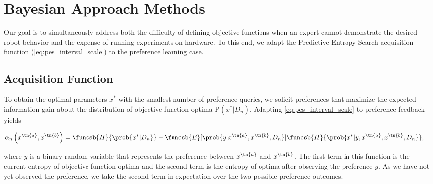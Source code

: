 \section{Bayesian Approach Methods}
Our goal is to simultaneously address both the difficulty of defining objective
functions when an expert cannot demonstrate the desired robot behavior and the
expense of running experiments on hardware. To this end, we adapt the Predictive
Entropy Search acquisition function (\cref{eq:pes_interval_scale}) to the
preference learning case.

\subsection{Acquisition Function}
To obtain the optimal parameters $x^*$ with the smallest number of preference
queries, we solicit preferences that maximize the expected information gain
about the distribution of objective function optima $\mathrm{P}(x^*|D_n)$.
Adapting \cref{eq:pes_interval_scale} to preference feedback yields
\begin{fullwidth}
\begin{align}
    &\alpha_n \left(x^\tn{a}, x^\tn{b}\right) 
        = \funcsb{H}{\prob{x^*|D_n}} - \funcsb{E}[\prob{y|x^\tn{a},x^\tn{b},D_n}]
            {\funcsb{H}{\prob{x^*|y, x^\tn{a}, x^\tn{b}, D_n}}},
    \label{eq:acquisition_orig}
\end{align}
\end{fullwidth}
where $y$ is a binary random variable that represents the preference between
$x^\tn{a}$ and $x^\tn{b}$. The first term in this function is the current
entropy of objective function optima and the second term is the entropy of
optima after observing the preference $y$. As we have not yet observed the
preference, we take the second term in expectation over the two possible
preference outcomes.

